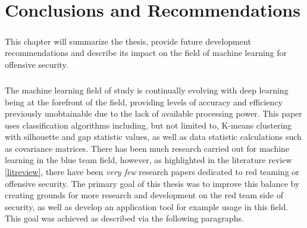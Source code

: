 \chapter{Conclusions and Recommendations}
\label{conc}

\paragraph{}This chapter will summarize the thesis, provide future development recommendations and describe its impact on the field of machine learning for offensive security.

\paragraph{}The machine learning field of study is continually evolving with deep learning being at the forefront of the field, providing levels of accuracy and efficiency previously unobtainable due to the lack of available processing power. This paper uses classification algorithms including, but not limited to, K-means clustering with silhouette and gap statistic values, as well as data statistic calculations such as covariance matrices. There has been much research carried out for machine learning in the blue team field, however, as highlighted in the literature review \ref{litreview}, there have been \textit{very few} research papers dedicated to red teaming or offensive security. The primary goal of this thesis was to improve this balance by creating grounds for more research and development on the red team side of security, as well as develop an application tool for example usage in this field. This goal was achieved as described via the following paragraphs.


